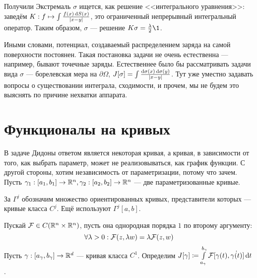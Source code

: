 \documentclass[a4paper]{article}
\begin{document}
    Получили
Экстремаль $\sigma$ ищется, как решение <<интегрального уравнения>>: заведём $K: f \mapsto \int \frac{f(x)\operatorname{d}\! S(x)}{|x - y|}$, это ограниченный непрерывный интегральный оператор.
    Таким образом, $\sigma$ --- решение $K \sigma = \frac{\lambda}{2}\1$.

    Иными словами, потенциал, создаваемый распределением заряда на самой поверхности постоянен.
    Такая постановка задачи не очень естественна --- например, бывают точечные заряды.
    Естественнее было бы рассматривать задачи вида $\sigma$ --- борелевская мера на $\partial \Omega$, $J[\sigma] = \int\frac{\operatorname{d}\!\sigma(x)\operatorname{d}\! \sigma(y)}{|x - y|}$.
        Тут уже уместно задавать вопросы о существовании интеграла, сходимости, и прочем, мы не будем это выяснять по причине нехватки аппарата.
    \section{Функционалы на кривых}
    В задаче Дидоны ответом является некоторая кривая, а кривая, в зависимости от того, как выбрать параметр, может не реализовываться, как график функции.
    С другой стороны, хотим независимость от параметризации, потому что зачем.
    Пусть $\gamma_1: [a_1, b_1] \rightarrow \mathbb{R}^n, \gamma_2: [a_2, b_2] \rightarrow \mathbb{R}^n$ --- две параметризованные кривые.

    За $\Gamma^j$ обозначим множество ориентированных кривых, представители которых --- кривые класса $C^j$.
    Ещё используют $\Gamma^j[a, b]$.

    Пускай $\mathcal{F} \in C(\mathbb{R}^n \times \mathbb{R}^n)$, пусть она однородная порядка $1$ по второму аргументу: \[\forall \lambda > 0: \mathcal{F}(z, \lambda w) = \lambda \mathcal{F}(z, w)\]
    Пусть $\gamma: [a_\gamma, b_\gamma] \rightarrow \mathbb{R}^d$ --- кривая класса $C^1$.
    Определим $J[\gamma] \coloneqq \int\limits_{a_\gamma}^{b_\gamma}\mathcal{F}[\gamma(t), \dot{\gamma(t)}]\operatorname{d}\! t$.
\end{document}
